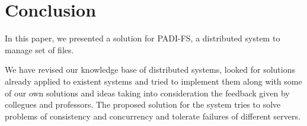 \section{Conclusion}

In this paper, we presented a solution for PADI-FS, a distributed system 
to manage set of files.

We have revised our knowledge base of distributed systems, looked for solutions 
already applied to existent systems and tried to implement them along with some 
of our own solutions and ideas taking into consideration the feedback given
by collegues and professors. The proposed solution for the system tries to 
solve problems of consistency and concurrency and tolerate failures of different 
servers.